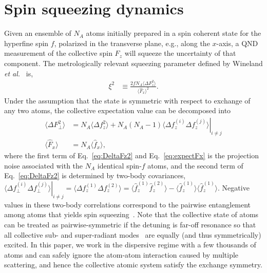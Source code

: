 \documentclass[preprint,aps,pra,onecolumn,superscriptaddress]{revtex4-1} %
\newcommand{\expect}[1]{\big\langle #1 \big\rangle}
\begin{document}
\section{Spin squeezing dynamics}

Given an ensemble of $N_A$ atoms initially prepared in a spin coherent state for the hyperfine spin $f$, polarized in the transverse plane, e.g., along the $x$-axis, a QND measurement of the collective spin  $F_z$ will squeeze the uncertainty of that component.  The metrologically relevant squeezing parameter defined by Wineland {\emph{et al.}}~\cite{Wineland1992} is,
\begin{align}\label{eq:xi2Faraday}
\xi^2 &\equiv  \frac{2 f N_A\expect{\Delta F_z ^2}}{\expect{\hat{F}_x}^2}.
\end{align}
Under the assumption that the state is symmetric with respect to exchange of any two atoms, the collective expectation value can be decomposed into \begin{align}
\expect{\Delta F_\perp^2} &= N_A \expect{\Delta f_z^2}+N_A(N_A-1)\left. \expect{\Delta f_z^{(i)}\Delta f_z^{(j)}}\right|_{i\neq j}\label{eq:DeltaFz2}\\
\expect{\hat{F}_x } & =N_A \expect{\hat{f}_x},\label{eq:expectFx}
\end{align}
where the first term of Eq.~\eqref{eq:DeltaFz2} and Eq.~\eqref{eq:expectFx} is the projection noise associated with the  $N_A$ identical spin-$f$  atoms, and  the second term of Eq.~\eqref{eq:DeltaFz2} is determined by two-body covariances, $ \left.\expect{\Delta f_\perp^{(i)}\Delta f_\perp^{(j)}}\right|_{i\neq j}=\expect{\Delta f_z^{(1)}\Delta f_z^{(2)}} = \expect{\hat{f}_z^{(1)}\hat{f}_z^{(2)}}-\expect{\hat{f}_z^{(1)}} \expect{\hat{f}_z^{(1)}} $.  Negative values in these two-body correlations correspond to the pairwise entanglement among atoms that yields spin squeezing~\cite{Wang2003Spin}.  Note that the collective state of atoms can be treated as pairwise-symmetric if the detuning is far-off resonance so that all collective sub- and super-radiant modes~\cite{Asenjo-Garcia2017Atom,Asenjo-Garcia2017Exponential} are equally (and thus symmetrically) excited.  In this paper, we work in the dispersive regime with a few thousands of atoms and can safely ignore the atom-atom interaction caused by multiple scattering, and hence the collective atomic system satisfy the exchange symmetry. 
\end{document}
